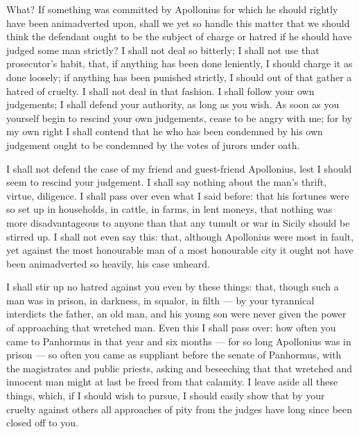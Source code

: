  What? If something was committed by Apollonius for which he should rightly have been animadverted upon, shall we yet so handle this matter that we should think the defendant ought to be the subject of charge or hatred if he should have judged some man strictly? I shall not deal so bitterly; I shall not use that prosecutor's habit, that, if anything has been done leniently, I should charge it as done loosely; if anything has been punished strictly, I should out of that gather a hatred of cruelty. I shall not deal in that fashion. I shall follow your own judgements; I shall defend your authority, as long as you wish. As soon as you yourself begin to rescind your own judgements, cease to be angry with me; for by my own right I shall contend that he who has been condemned by his own judgement ought to be condemned by the votes of jurors under oath.

 I shall not defend the case of my friend and guest-friend Apollonius, lest I should seem to rescind your judgement. I shall say nothing about the man's thrift, virtue, diligence. I shall pass over even what I said before: that his fortunes were so set up in households, in cattle, in farms, in lent moneys, that nothing was more disadvantageous to anyone than that any tumult or war in Sicily should be stirred up. I shall not even say this: that, although Apollonius were most in fault, yet against the most honourable man of a most honourable city it ought not have been animadverted so heavily, his case unheard.

 I shall stir up no hatred against you even by these things: that, though such a man was in prison, in darkness, in squalor, in filth --- by your tyrannical interdicts the father, an old man, and his young son were never given the power of approaching that wretched man. Even this I shall pass over: how often you came to Panhormus in that year and six months --- for so long Apollonius was in prison --- so often you came as suppliant before the senate of Panhormus, with the magistrates and public priests, asking and beseeching that that wretched and innocent man might at last be freed from that calamity. I leave aside all these things, which, if I should wish to pursue, I should easily show that by your cruelty against others all approaches of pity from the judges have long since been closed off to you.

